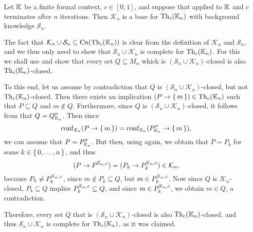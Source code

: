 \begin{Theorem}
  \label{thm:confident-bases-with-growing-sets-of-attributes}
  Let ${\mathbb{K}}$ be a finite formal context, $c \in [0,1]$, and suppose that
   applied to ${\mathbb{K}}$ and $c$ terminates
  after $n$ iterations.  Then $\mathcal{K}_{n}$ is a base for $\operatorname{Th}_{c}({\mathbb{K}}_{n})$ with
  background knowledge $\mathcal{S}_{n}$.
\end{Theorem}
\begin{Proof}
  The fact that $\mathcal{K}_{n} \cup \mathcal{S}_{n} \subseteq \operatorname{Cn}(\operatorname{Th}_{c}({\mathbb{K}}_{n}))$
  is clear from the definition of $\mathcal{K}_{n}$ and $\mathcal{S}_{n}$, and we thus
  only need to show that $\mathcal{S}_{n} \cup \mathcal{K}_{n}$ is complete for
  $\operatorname{Th}_{c}({\mathbb{K}}_{n})$.  For this we shall use
   and show that every set $Q \subseteq M_{n}$
  which is $(\mathcal{S}_{n} \cup \mathcal{K}_{n})$-closed is also $\operatorname{Th}_{c}({\mathbb{K}}_{n})$-closed.

  To this end, let us assume by contradiction that $Q$ is $(\mathcal{S}_{n} \cup
  \mathcal{K}_{n})$-closed, but not $\operatorname{Th}_{c}({\mathbb{K}}_{n})$-closed.  Then there exists an
  implication $(P \to {\ensuremath{\{\,m\,\}}}) \in \operatorname{Th}_{c}({\mathbb{K}}_{n})$ such that $P \subseteq Q$ and $m
  \notin Q$.  Furthermore, since $Q$ is $(\mathcal{S}_{n} \cup \mathcal{K}_{n})$-closed,
  it follows from 
  that $Q = Q_{{\mathbb{K}}_{n}}''$.  Then since
  \begin{equation*}
    \operatorname{conf}_{{\mathbb{K}}_{n}}(P \to {\ensuremath{\{\,m\,\}}}) = \operatorname{conf}_{{\mathbb{K}}_{n}}(P_{{\mathbb{K}}_{n}}'' \to {\ensuremath{\{\,m\,\}}}),
  \end{equation*}
  we can assume that $P = P_{{\mathbb{K}}_{n}}''$.  But then, using
   again, we obtain
  that $P = P_{k}$ for some $k \in {\ensuremath{\{\, 0, \dots, n \,\}}}$, and thus
  \begin{equation*}
    (P \to P^{{\mathbb{K}}_{n}, c}) = (P_{k} \to P_{k}^{{\mathbb{K}}_{n}, c}) \in \mathcal{K}_{n},
  \end{equation*}
  because $P_{k} \neq P_{k}^{{\mathbb{K}}_{n}, c}$, since $m \notin P_{k} \subseteq Q$, but $m
  \in P_{k}^{{\mathbb{K}}_{n}, c}$.  Now since $Q$ is $\mathcal{K}_{n}$-closed, $P_{k} \subseteq
  Q$ implies $P_{k}^{{\mathbb{K}}_{n}, c} \subseteq Q$, and since $m \in P_{k}^{{\mathbb{K}}_{n}, c}$,
  we obtain $m \in Q$, a contradiction.

  Therefore, every set $Q$ that is $(\mathcal{S}_{n} \cup \mathcal{K}_{n})$-closed is also
  $\operatorname{Th}_{c}({\mathbb{K}}_{n})$-closed, and thus $\mathcal{S}_{n} \cup \mathcal{K}_{n}$ is
  complete for $\operatorname{Th}_{c}({\mathbb{K}}_{n})$, as it was claimed.
\end{Proof}

